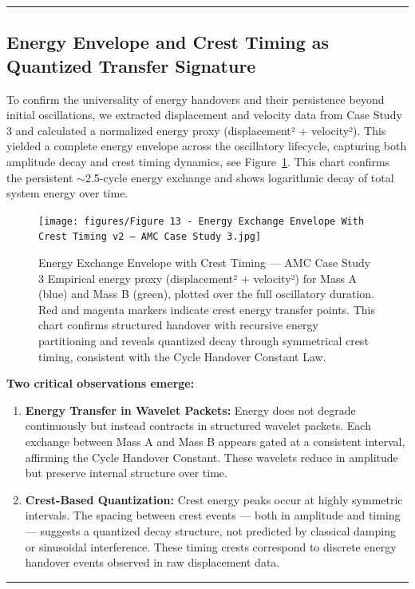 \documentclass[10pt,aps,pre,onecolumn,superscriptaddress,notitlepage]{revtex4-2}
\begin{document}
\vspace{1em}
\hrule
\vspace{0.2em}
\clearpage
\subsection{Energy Envelope and Crest Timing as Quantized Transfer Signature}
\label{sec:EnergyEnvelopeandCrest}

To confirm the universality of energy handovers and their persistence beyond initial oscillations, we extracted displacement and velocity data from Case Study 3 and calculated a normalized energy proxy (displacement² + velocity²). This yielded a complete energy envelope across the oscillatory lifecycle, capturing both amplitude decay and crest timing dynamics, see Figure~\ref{fig:enenvelope}.
This chart confirms the persistent $\sim$2.5-cycle energy exchange and shows logarithmic decay of total system energy over time.

\begin{figure}[htbp]
  \centering
  \texttt{[image: figures/Figure 13 - Energy Exchange Envelope With Crest Timing v2 — AMC Case Study 3.jpg]}
  \caption{Energy Exchange Envelope with Crest Timing — AMC Case Study 3
Empirical energy proxy (displacement² + velocity²) for Mass A (blue) and Mass B (green), plotted over the full oscillatory duration. Red and magenta markers indicate crest energy transfer points. This chart confirms structured handover with recursive energy partitioning and reveals quantized decay through symmetrical crest timing, consistent with the Cycle Handover Constant Law.}
  \label{fig:enenvelope}
\end{figure}

\textbf{Two critical observations emerge:}
\begin{enumerate}
    \item \textbf{Energy Transfer in Wavelet Packets:} Energy does not degrade continuously but instead contracts in structured wavelet packets. Each exchange between Mass A and Mass B appears gated at a consistent interval, affirming the Cycle Handover Constant. These wavelets reduce in amplitude but preserve internal structure over time.
    \item \textbf{Crest-Based Quantization:} Crest energy peaks occur at highly symmetric intervals. The spacing between crest events — both in amplitude and timing — suggests a quantized decay structure, not predicted by classical damping or sinusoidal interference. These timing crests correspond to discrete energy handover events observed in raw displacement data.    
\end{enumerate}
\vspace{1em}
\hrule
\vspace{0.2em}
\end{document}
